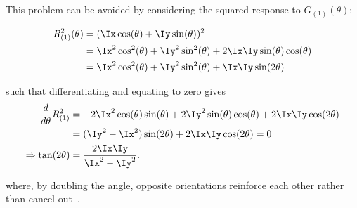This problem can be avoided by considering the squared response to $G_{(1)}(\theta)$:

\begin{align}
R_{(1)}^2(\theta)
	&=	(\Ix \cos(\theta) + \Iy \sin(\theta))^2 \\
	&= 	\Ix^2 \cos^2(\theta)+\Iy^2 \sin^2(\theta)+2\Ix\Iy\sin(\theta)\cos(\theta) \\
	&= 	\Ix^2 \cos^2(\theta)+\Iy^2 \sin^2(\theta)+\Ix\Iy\sin(2\theta)
\label{e:R1sqr}
\end{align}

\noindent such that differentiating and equating to zero gives
%
\begin{align}
\frac{d}{d\theta}R_{(1)}^2
	&= 	-2\Ix^2 \cos(\theta)\sin(\theta) + 2\Iy^2 \sin(\theta)\cos(\theta) + 2\Ix\Iy\cos(2\theta) \\
	&= 	(\Iy^2-\Ix^2) \sin(2\theta) + 2\Ix\Iy\cos(2\theta) = 0 \\
\Rightarrow \tan(2\theta)
	&= 	\frac{2\Ix\Iy}{\Ix^2-\Iy^2}.
\label{e:t1sqr}
\end{align}

\noindent where, by doubling the angle, opposite orientations reinforce each other rather than cancel out~\cite{Mardia_Jupp_00}. 
